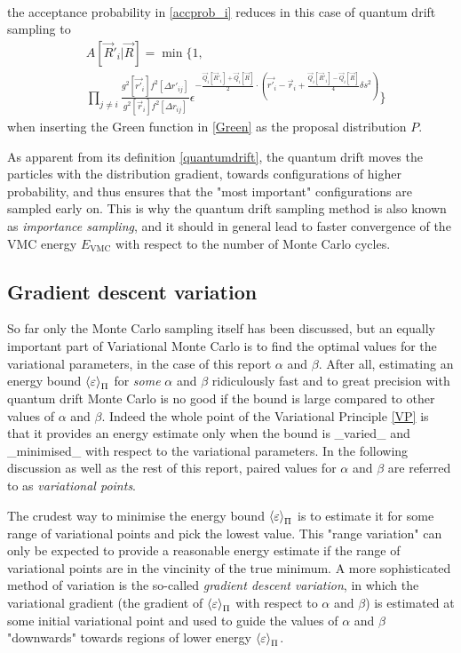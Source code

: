 \documentclass[a4paper,8pt]{article}
\begin{document}
\begin{multicols}{2}
\begin{align}
\end{align}
the acceptance probability in \eqref{accprob_i} reduces in this case of quantum drift sampling to
\begin{align}
&A[\vec{R}'_i|\vec{R}] = \min\Bigg\{1, \nonumber\\
&\prod\limits_{j \neq i} \frac{g^2[\vec{r'}_i]f^2[\Delta r'_{ij}]}{g^2[\vec{r}_i]f^2[\Delta r_{ij}]}\epsilon^{-\frac{\vec{Q}_i[\vec{R}'_i]+\vec{Q}_i[\vec{R}]}{2}\cdot\left(\vec{r'}_i-\vec{r}_i+\frac{\vec{Q}_i[\vec{R}'_i]-\vec{Q}_i[\vec{R}]}{4}\delta s^2\right)}\Bigg\} \label{accprobQD}
\end{align}
when inserting the Green function in \eqref{Green} as the proposal distribution $P$.

As apparent from its definition \eqref{quantumdrift}, the quantum drift moves the particles with the distribution gradient, towards configurations of higher probability, and thus ensures that the "most important" configurations are sampled early on. This is why the quantum drift sampling method is also known as \textit{importance sampling}, and it should in general lead to faster convergence of the VMC energy $E_\text{VMC}$ with respect to the number of Monte Carlo cycles.


\subsection{Gradient descent variation}\label{gradientdescent}
So far only the Monte Carlo sampling itself has been discussed, but an equally important part of Variational Monte Carlo is to find the optimal values for the variational parameters, in the case of this report $\alpha$ and $\beta$. After all, estimating an energy bound $\ev{\varepsilon}_\Pi$ for \textit{some} $\alpha$ and $\beta$ ridiculously fast and to great precision with quantum drift Monte Carlo is no good if the bound is large compared to other values of $\alpha$ and $\beta$. Indeed the whole point of the Variational Principle \eqref{VP} is that it provides an energy estimate only when the bound is \_varied\_ and \_minimised\_ with respect to the variational parameters. In the following discussion as well as the rest of this report, paired values for $\alpha$ and $\beta$ are referred to as \textit{variational points}.

The crudest way to minimise the energy bound $\ev{\varepsilon}_\Pi$ is to estimate it for some range of variational points and pick the lowest value. This "range variation" can only be expected to provide a reasonable energy estimate if the range of variational points are in the vincinity of the true minimum. A more sophisticated method of variation is the so-called \textit{gradient descent variation}, in which the variational gradient (the gradient of $\ev{\varepsilon}_\Pi$ with respect to $\alpha$ and $\beta$) is estimated at some initial variational point and used to guide the values of $\alpha$ and $\beta$ "downwards" towards regions of lower energy $\ev{\varepsilon}_\Pi$.


\end{multicols}
\end{document}
